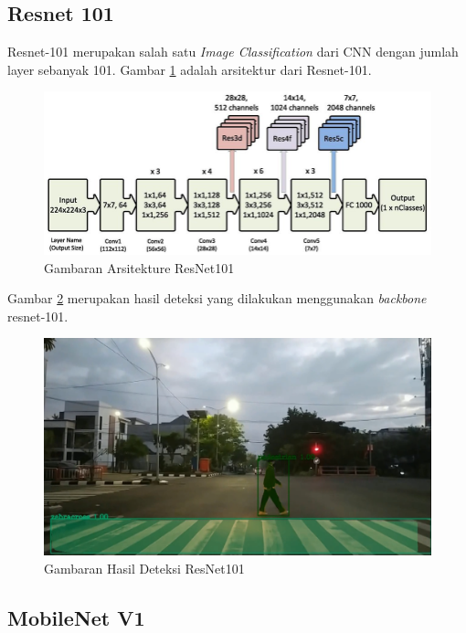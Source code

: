 \subsection{Resnet 101}
\label{resnet101}

Resnet-101 merupakan salah satu \textit{Image Classification} dari CNN dengan jumlah layer sebanyak 101. Gambar \ref{fig:resnet101-arch} adalah arsitektur dari Resnet-101.

\begin{figure}[ht]
	\centering
	\includegraphics[scale=0.3]{gambar/resnet101.png}
	\caption{Gambaran Arsitekture ResNet101}
	\label{fig:resnet101-arch}
\end{figure} 

Gambar \ref{fig:resnet101-hasil} merupakan hasil deteksi yang dilakukan menggunakan \textit{backbone} resnet-101.
\begin{figure}[ht]
	\centering
	\includegraphics[scale=0.15]{gambar/hasil-resnet101.png}
	\caption{Gambaran Hasil Deteksi ResNet101}
	\label{fig:resnet101-hasil}
\end{figure} 


\subsection{MobileNet V1}
\label{mobilenetv1}

